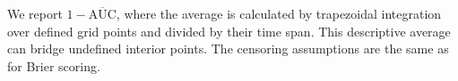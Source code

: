We report $1-\overline{\mathrm{AUC}}$, where the average is calculated
by trapezoidal integration over defined grid points and divided by
their time span. This descriptive average can bridge undefined interior
points. The censoring assumptions are the same as for Brier scoring.

